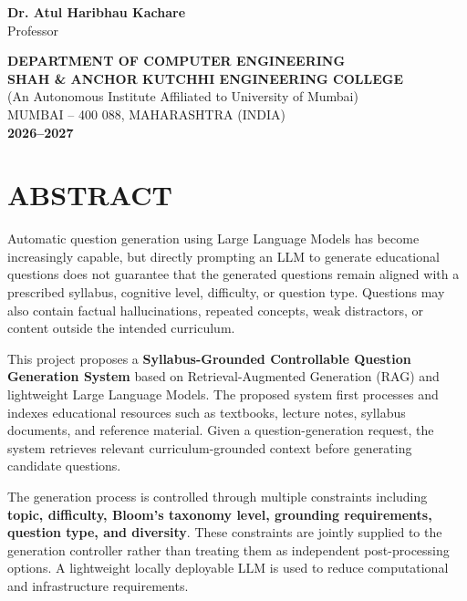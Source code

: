 \documentclass[12pt,a4paper]{report}
\newcommand{\college}{
SHAH \& ANCHOR KUTCHHI ENGINEERING COLLEGE
}
\newcommand{\department}{
DEPARTMENT OF COMPUTER ENGINEERING
}
\newcommand{\academicyear}{
2026--2027
}
\begin{document}
\begin{titlepage}
\begin{center}
{\fontsize{11}{13}\selectfont
\textbf{Dr. Atul Haribhau Kachare}}\\[0.03cm]

{\fontsize{10}{12}\selectfont
Professor}

\vfill

{\fontsize{13}{15}\selectfont
\textbf{\department}}\\[0.10cm]

{\fontsize{11}{13}\selectfont
\textbf{\college}}\\[0.05cm]

{\fontsize{10}{12}\selectfont
(An Autonomous Institute Affiliated to University of Mumbai)}\\[0.08cm]

{\fontsize{10}{12}\selectfont
MUMBAI -- 400 088, MAHARASHTRA (INDIA)}\\[0.10cm]

{\fontsize{11}{13}\selectfont
\textbf{\academicyear}}

\end{center}
\end{titlepage}%

\chapter*{ABSTRACT}

Automatic question generation using Large Language Models has become increasingly capable, but directly prompting an LLM to generate educational questions does not guarantee that the generated questions remain aligned with a prescribed syllabus, cognitive level, difficulty, or question type. Questions may also contain factual hallucinations, repeated concepts, weak distractors, or content outside the intended curriculum.

This project proposes a \textbf{Syllabus-Grounded Controllable Question Generation System} based on Retrieval-Augmented Generation (RAG) and lightweight Large Language Models. The proposed system first processes and indexes educational resources such as textbooks, lecture notes, syllabus documents, and reference material. Given a question-generation request, the system retrieves relevant curriculum-grounded context before generating candidate questions.

The generation process is controlled through multiple constraints including \textbf{topic, difficulty, Bloom's taxonomy level, grounding requirements, question type, and diversity}. These constraints are jointly supplied to the generation controller rather than treating them as independent post-processing options. A lightweight locally deployable LLM is used to reduce computational and infrastructure requirements.
\end{document}
